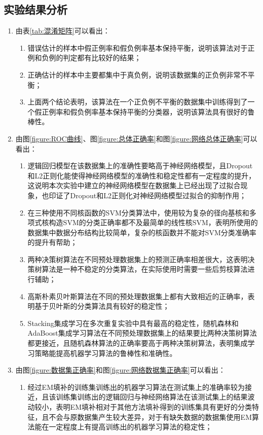 \documentclass[a4paper]{ctexart}
\begin{document}
\subsection{实验结果分析}
\begin{enumerate}
	\item 由表\ref{tab:混淆矩阵}可以看出：
	\begin{enumerate}[label=\alph*)]
		\item 错误估计的样本中假正例率和假负例率基本保持平衡，说明该算法对于正例和负例的判定都有比较好的结果；
		\item 正确估计的样本中主要都集中于真负例，说明该数据集的正负例非常不平衡；
		\item 上面两个结论表明，该算法在一个正负例不平衡的数据集中训练得到了一个假正例率和假负例率基本保持平衡的分类器，说明该算法具有很好的鲁棒性。
	\end{enumerate}
	\item 由图\ref{figure:ROC曲线}、图\ref{figure:总体正确率}和图\ref{figure:网络总体正确率}可以看出：
	      \begin{enumerate}[label=\alph*)]
		      \item 逻辑回归模型在该数据集上的准确性要略高于神经网络模型，且Dropout和L2正则化能使得神经网络模型的准确性和稳定性都有一定程度的提升，这说明本次实验中建立的神经网络模型在数据集上已经出现了过拟合现象，也印证了Dropout和L2正则化对神经网络模型过拟合的抑制作用；
		      \item 在三种使用不同核函数的SVM分类算法中，使用较为复杂的径向基核和多项式核构造SVM的分类正确率都不及最简单的线性核SVM，表明所使用的数据集中数据分布结构比较简单，复杂的核函数并不能对SVM分类准确率的提升有帮助；
		      \item 两种决策树算法在不同预处理数据集上的预测正确率相差很大，这表明决策树算法是一种不稳定的分类算法，在实际使用时需要一些后剪枝算法进行辅助\cite{dwyer2007decision}；
			  \item 高斯朴素贝叶斯算法在不同的预处理数据集上都有大致相近的正确率，表明基于贝叶斯的分类算法具有较好的稳定性；
			  \item Stacking集成学习在多次重复实验中具有最高的稳定性，随机森林和AdaBoost集成学习算法在不同预处理数据集上的结果要比两种决策树算法都更接近，且随机森林算法的正确率要高于两种决策树算法，表明集成学习策略能提高机器学习算法的鲁棒性和准确性。
	      \end{enumerate}
	\item 由图\ref{figure:数据集正确率}和图\ref{figure:网络数据集正确率}可以看出：
	      \begin{enumerate}[label=\alph*)]
		      \item 经过EM填补的训练集训练出的机器学习算法在测试集上的准确率较为接近，且该训练集训练出的逻辑回归与神经网络算法在该测试集上的结果波动较小，表明EM填补相对于其他方法填补得到的训练集具有更好的分类特征，且不会与原数据集产生较大差异，对于有缺失数据的数据集使用EM算法能在一定程度上有提高训练出的机器学习算法的稳定性；

\end{enumerate}
\end{enumerate}
\end{document}
